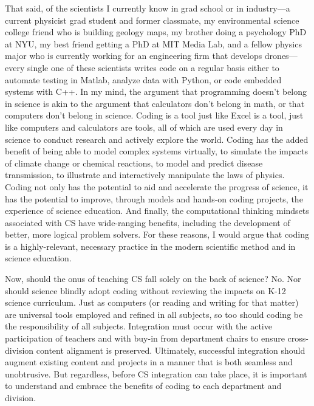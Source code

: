 That said, of the scientists I currently know in grad school or in industry---a current physicist grad student and former classmate, my environmental science college friend who is building geology maps, my brother doing a psychology PhD at NYU, my best friend getting a PhD at MIT Media Lab, and a fellow physics major who is currently working for an engineering firm that develops drones---every single one of these scientists writes code on a regular basis either to automate testing in Matlab, analyze data with Python, or code embedded systems with C++. In my mind, the argument that programming doesn't belong in science is akin to the argument that calculators don't belong in math, or that computers don't belong in science. Coding is a tool just like Excel is a tool, just like computers and calculators are tools, all of which are used every day in science to conduct research and actively explore the world. Coding has the added benefit of being able to model complex systems virtually, to simulate the impacts of climate change or chemical reactions, to model and predict disease transmission, to illustrate and interactively manipulate the laws of physics. Coding not only has the potential to aid and accelerate the progress of science, it has the potential to improve, through models and hands-on coding projects, the experience of science education. And finally, the computational thinking mindsets associated with CS have wide-ranging benefits, including the development of better, more logical problem solvers. For these reasons, I would argue that coding is a highly-relevant, necessary practice in the modern scientific method and in science education.\par
Now, should the onus of teaching CS fall solely on the back of science? No. Nor should science blindly adopt coding without reviewing the impacts on K-12 science curriculum. Just as computers (or reading and writing for that matter) are universal tools employed and refined in all subjects, so too should coding be the responsibility of all subjects. Integration must occur with the active participation of teachers and with buy-in from department chairs to ensure cross-division content alignment is preserved. Ultimately, successful integration should augment existing content and projects in a manner that is both seamless and unobtrusive. But regardless, before CS integration can take place, it is important to understand and embrace the benefits of coding to each department and division.\par

